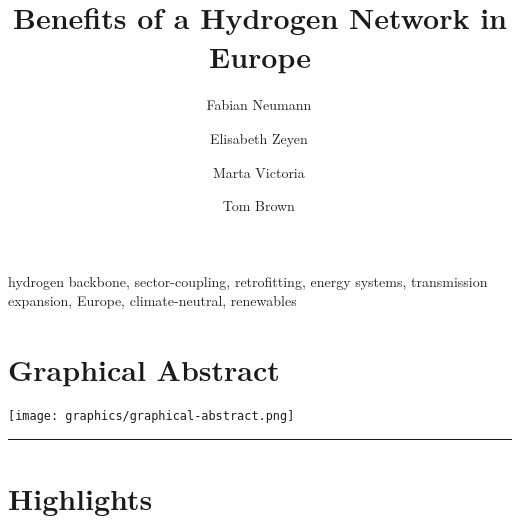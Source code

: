 \documentclass[12pt,preprint]{elsarticle}
\begin{document}
\begin{frontmatter}

	\title{Benefits of a Hydrogen Network in Europe}

	\author[tubaddress]{Fabian Neumann\,}
	\author[tubaddress]{Elisabeth Zeyen\,}
	\author[aarhus,aarhus2]{Marta Victoria\,}
	\author[tubaddress]{Tom Brown\,}
	\address[tubaddress]{Department of Digital Transformation in Energy Systems, Institute of Energy Technology, Technische Universität Berlin, Fakultät III, Einsteinufer 25 (TA 8), 10587 Berlin, Germany}
	\address[aarhus]{Department of Mechanical and Production Engineering, Aarhus University, Inge Lehmanns Gade 10, 8000 Aarhus, Denmark}
	\address[aarhus2]{Novo Nordisk Foundation CO$_2$ Research Center, Aarhus University, Aarhus, Denmark}

	\begin{abstract}
		
	\end{abstract}

	\begin{keyword}
		hydrogen backbone, sector-coupling, retrofitting, energy systems, transmission expansion, Europe, climate-neutral, renewables
	\end{keyword}


\end{frontmatter}

\section*{Graphical Abstract}

\texttt{[image: graphics/graphical-abstract.png]}

\par\noindent\rule{\textwidth}{0.4pt}

\section*{Highlights}
\end{document}
